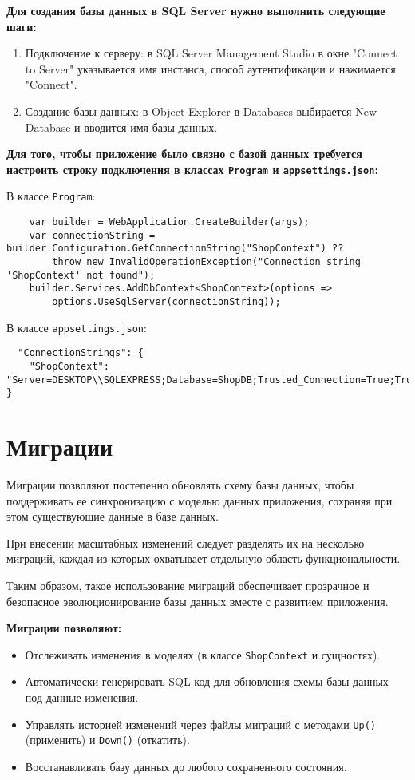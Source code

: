 \documentclass[a4paper,12pt]{report}
\begin{document}
\textbf{Для создания базы данных в SQL Server нужно выполнить следующие шаги:}
\begin{enumerate}
    \item
        Подключение к серверу: в SQL Server Management Studio в окне "Connect to Server" 
        указывается имя инстанса, способ аутентификации и нажимается "Connect".
    \item
        Создание базы данных: в Object Explorer в Databases выбирается New Database 
        и вводится имя базы данных.
\end{enumerate}

\textbf{Для того, чтобы приложение было связно с базой данных требуется настроить 
строку подключения в классах \texttt{Program} и \texttt{appsettings.json}:}

В классе \texttt{Program}:
\begin{verbatim}
    var builder = WebApplication.CreateBuilder(args);
    var connectionString = builder.Configuration.GetConnectionString("ShopContext") ??
        throw new InvalidOperationException("Connection string 'ShopContext' not found");
    builder.Services.AddDbContext<ShopContext>(options =>
        options.UseSqlServer(connectionString));
\end{verbatim}

В классе \texttt{appsettings.json}:
\begin{verbatim}
  "ConnectionStrings": {
    "ShopContext": "Server=DESKTOP\\SQLEXPRESS;Database=ShopDB;Trusted_Connection=True;TrustServerCertificate=True;"
}
\end{verbatim}
    
\section{Миграции}

Миграции позволяют постепенно обновлять схему базы данных, чтобы поддерживать ее синхронизацию 
с моделью данных приложения, сохраняя при этом существующие данные в базе данных.\cite{migration}

При внесении масштабных изменений следует разделять их на несколько миграций, каждая из которых охватывает отдельную область функциональности.

Таким образом, такое использование миграций обеспечивает прозрачное и безопасное эволюционирование базы данных вместе с развитием приложения.

\textbf{Миграции позволяют:}
\begin{itemize}
    \item
        Отслеживать изменения в моделях (в классе \texttt{ShopContext} и сущностях).
    \item
        Автоматически генерировать \acs{SQL}-код для обновления схемы базы данных под данные изменения.
    \item
        Управлять историей изменений через файлы миграций с методами \texttt{Up()} (применить) и \texttt{Down()} (откатить).
    \item
        Восстанавливать базу данных до любого сохраненного состояния.
\end{itemize}
\end{document}
